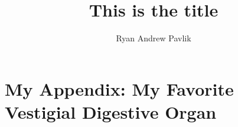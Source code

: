 \documentclass[capstoc,capschap]{rpisudiss}
\title{This is the title}
\author{Ryan Andrew Pavlik}
\begin{document}
\frontmatter

\tableofcontents

\mainmatter %

\appendix

\chapter{My Appendix: My Favorite Vestigial Digestive Organ}
\blindtext
\end{document}
